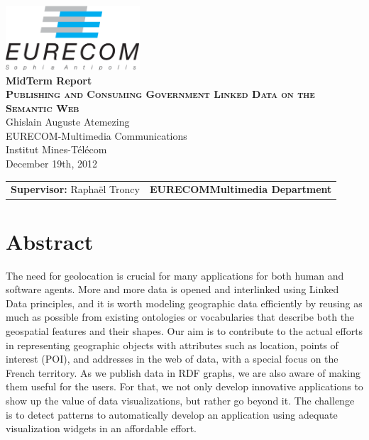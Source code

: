 \documentclass[a4paper,11pt]{report}
\begin{document}
\begin{titlepage}
\begin{center}
\includegraphics[width=5cm]{EURECOM_logo_quadri}
\\[3cm]
\textbf{\Huge{MidTerm Report}}
\\[4cm]
\textbf{\textsc{\LARGE{Publishing and Consuming Government Linked Data on the Semantic Web}}}
\\[0.5cm]
\LARGE{Ghislain Auguste Atemezing}
\\[0.5cm]
\small{EURECOM-Multimedia Communications}
\\
\large{Institut Mines-T\'{e}l\'{e}com}
\\
\large{December 19th, 2012}
\\[5cm]
\begin{tabular}{p{8cm} p{8.5cm}}
\small{\textbf{Supervisor:}\newline
Rapha\"el Troncy} 
&
\small{\textbf{EURECOM\newline Multimedia Department}}
\end{tabular}
\end{center}
\end{titlepage}

 \tableofcontents

\chapter*{Abstract}

The need for geolocation is crucial for many applications for both human and software agents. More and more data is opened and interlinked using Linked Data principles, and it is worth modeling geographic data efficiently by reusing as much as possible from existing ontologies or vocabularies that describe both the geospatial features and their shapes. Our aim is to contribute to the actual efforts in representing geographic objects with attributes such as location, points of interest (POI), and addresses in the web of data, with a special focus on the French territory.
As we publish data in RDF graphs, we are also aware of making them useful for the users. For that, we not only develop innovative applications to show up the value of data visualizations, but rather go beyond it. The challenge is to detect patterns to automatically develop an application using adequate visualization widgets in an affordable effort.  
\end{document}
